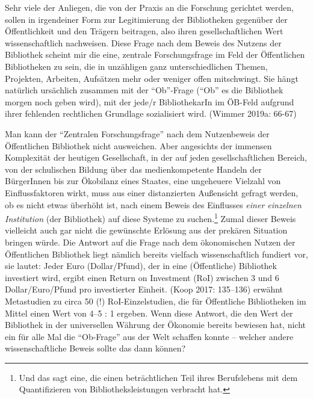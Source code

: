 \documentclass[a4paper,
fontsize=11pt,
oneside,
numbers=noperiodatend,
parskip=half-,
bibliography=totoc,
final
]{scrartcl}
\begin{document}
Sehr viele der Anliegen, die von der Praxis an die Forschung gerichtet
werden, sollen in irgendeiner Form zur Legitimierung der Bibliotheken
gegenüber der Öffentlichkeit und den Trägern beitragen, also ihren
gesellschaftlichen Wert wissenschaftlich nachweisen. Diese Frage nach
dem Beweis des Nutzens der Bibliothek scheint mir die eine, zentrale
Forschungsfrage im Feld der Öffentlichen Bibliotheken zu sein, die in
unzähligen ganz unterschiedlichen Themen, Projekten, Arbeiten, Aufsätzen
mehr oder weniger offen mitschwingt. Sie hängt natürlich ursächlich
zusammen mit der \enquote{Ob}-Frage (\enquote{Ob} es die Bibliothek
morgen noch geben wird), mit der jede/r BibliothekarIn im ÖB-Feld
aufgrund ihrer fehlenden rechtlichen Grundlage sozialisiert wird.
(Wimmer 2019a: 66-67)

Man kann der \enquote{Zentralen Forschungsfrage} nach dem Nutzenbeweis
der Öffentlichen Bibliothek nicht ausweichen. Aber angesichts der
immensen Komplexität der heutigen Gesellschaft, in der auf jeden
gesellschaftlichen Bereich, von der schulischen Bildung über das
medienkompetente Handeln der BürgerInnen bis zur Ökobilanz eines
Staates, eine ungeheuere Vielzahl von Einflussfaktoren wirkt, muss aus
einer distanzierten Außensicht gefragt werden, ob es nicht etwas
überhöht ist, nach einem Beweis des Einflusses \emph{einer einzelnen
Institution} (der Bibliothek) auf diese Systeme zu suchen.\footnote{Und
  das sagt eine, die einen beträchtlichen Teil ihres Berufslebens mit
  dem Quantifizieren von Bibliotheksleistungen verbracht hat.} Zumal
dieser Beweis vielleicht auch gar nicht die gewünschte Erlösung aus der
prekären Situation bringen würde. Die Antwort auf die Frage nach dem
ökonomischen Nutzen der Öffentlichen Bibliothek liegt nämlich bereits
vielfach wissenschaftlich fundiert vor, sie lautet: Jeder Euro
(Dollar/Pfund), der in eine (Öffentliche) Bibliothek investiert wird,
ergibt einen Return on Investment (RoI) zwischen 3 und 6
Dollar/Euro/Pfund pro investierter Einheit. (Koop 2017: 135--136)
erwähnt Metastudien zu circa 50 (!) RoI-Einzelstudien, die für
Öffentliche Bibliotheken im Mittel einen Wert von 4--5 : 1 ergeben. Wenn
diese Antwort, die den Wert der Bibliothek in der universellen Währung
der Ökonomie bereits bewiesen hat, nicht ein für alle Mal die
\enquote{Ob-Frage} aus der Welt schaffen konnte -- welcher andere
wissenschaftliche Beweis sollte das dann können?
\end{document}
